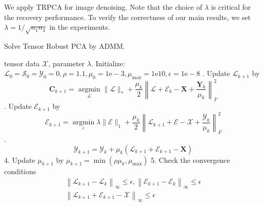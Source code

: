 \documentclass[english]{article}
\newcommand{\<}{\langle}
\renewcommand{\>}{\rangle}
\theoremstyle{definition}
\begin{document}
We apply TRPCA for image denoising. Note that the choice of $ \lambda $ is critical for the recovery performance. To verify the correctness of our main results, we set $ \lambda=1 / \sqrt{n_{1} n_{3}} $ in the experiments.\\
\begin{algorithm}  
	\caption{Solve Tensor Robust PCA by ADMM.}
	\begin{algorithmic} 
		\Require  
		tensor data $ \mathcal{X} $, parameter $ \lambda $.
		\State  Initialize: $ \mathcal{L}_{0}=\mathcal{S}_{0}=\mathcal{Y}_{0}=0, \rho=1.1, \mu_{0}=1 \mathrm{e}-3, 
		\mu_{\max }=1 \mathrm{e} 10, \epsilon=1 \mathrm{e}-8 $
		. Update $ \mathcal{L}_{k+1} $ by
		$$ \boldsymbol{C}_{k+1}=\underset{\boldsymbol{\boldsymbol{\mathcal { L }}}}{\operatorname{argmin}}\|\boldsymbol{\mathcal { L }}\|_{*}+\frac{\mu_{k}}{2}\left\|\boldsymbol{\mathcal { L }}+\boldsymbol{\mathcal { E }}_{k}-\boldsymbol{X}+\frac{\boldsymbol{Y}_{k}}{\mu_{k}}\right\|_{F}^{2} $$
		. Update $ \mathcal{E}_{k+1} $ by
		$$
		\mathcal{E}_{k+1}=\underset{\varepsilon}{\operatorname{argmin}} \lambda\|\mathcal{E}\|_{1}+\frac{\mu_{k}}{2}\left\|\mathcal{L}_{k+1}+\mathcal{E}-\mathcal{X}+\frac{\mathcal{Y}_{k}}{\mu_{k}}\right\|_{F}^{2} $$
		.  $$\boldsymbol{\mathcal{Y}}_{k+1}=\boldsymbol{\mathcal{Y}}_{k}+\mu_{k}\left(\mathcal{L}_{k+1}+\mathcal{E}_{k+1}-\boldsymbol{X}\right) $$
		4. Update $ \mu_{k+1} $ by $ \mu_{k+1}=\min \left(\rho \mu_{k}, \mu_{\max }\right) $
		5. Check the convergence conditions
		\begin{equation*}
		\begin{array}{l}
		\left\|\mathcal{L}_{k+1}-\mathcal{L}_{k}\right\|_{\infty} \leq \epsilon,\left\|\mathcal{E}_{k+1}-\mathcal{E}_{k}\right\|_{\infty} \leq \epsilon \\
		\left\|\mathcal{L}_{k+1}+\mathcal{E}_{k+1}-\mathcal{X}\right\|_{\infty} \leq \epsilon
		\end{array}
		\end{equation*}
		
		\EndWhile 
	\end{algorithmic}
\end{algorithm}

\newpage
\nocite{*}


\end{document}
